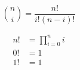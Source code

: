\documentclass[12pt,a5paper]{book}
\begin{document}
\begin{equation}
\binom{n}{i} = \frac{n!}{i!(n-i)!}
\end{equation}

\begin{align}
n! &= \prod_{i=0}^n i \\ 0! &= 1 \\  1! &= 1
\end{align}
\end{document}
